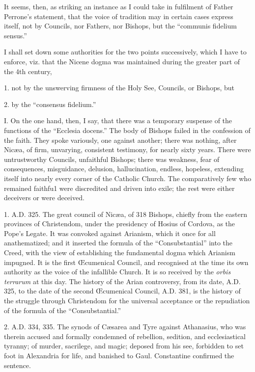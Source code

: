 It seems, then, as striking an instance as I could
take in fulfilment of Father Perrone's statement, that the voice of
tradition may in certain cases express itself, not by Councils, nor
Fathers, nor Bishops, but the ``communis fidelium sensus.''

I shall set down some authorities for the two
points successively, which I have to enforce, viz. that the Nicene dogma
was maintained during the greater part of the 4th century,

1. not by the unswerving firmness of the Holy See,
Councils, or Bishops, but

2. by the ``consensus fidelium.''

I. On the one hand, then, I say, that there was a
temporary suspense of the functions of the ``Ecclesia docens.'' The body
of Bishops failed in the confession of the faith. They spoke variously,
one against another; there was nothing, after Nicæa, of firm,
unvarying, consistent testimony, for nearly sixty years. There were
untrustworthy Councils, unfaithful Bishops; there was weakness, fear of
consequences, misguidance, delusion, hallucination, endless, hopeless,
extending itself into nearly every corner of the Catholic Church. The
comparatively few who remained faithfu1 were discredited and driven into
exile; the rest were either deceivers or were deceived.

1. A.D.
325. The great council of Nicæa, of 318 Bishops, chiefly from the
eastern provinces of Christendom, under the presidency of Hosius of
Cordova, as the Pope's Legate. It was convoked against Arianism, which
it once for all anathematized; and it inserted the formula of the ``Consubstantial''
into the Creed, with the view of establishing the fundamental dogma
which Arianism impugned. It is the first Œcumenical Council, and
recognised at the time its own authority as the voice of the infallible
Church. It is so received by the \emph{orbis terrarum} at this day. The
history of the Arian controversy, from its date, A.D.
325, to the date of the second Œcumenical Council, A.D. 381, is the history of the struggle through Christendom for
the universal acceptance or the repudiation of the formula of the ``Consubstantial.''

2. A.D.
334, 335. The synods of Cæsarea and Tyre against Athanasius, who was
therein accused and formally condemned of rebellion, sedition, and
ecclesiastical tyranny; of murder, sacrilege, and magic; deposed from
his see, forbidden to set foot in Alexandria for life, and banished to
Gaul. Constantine confirmed the sentence.


